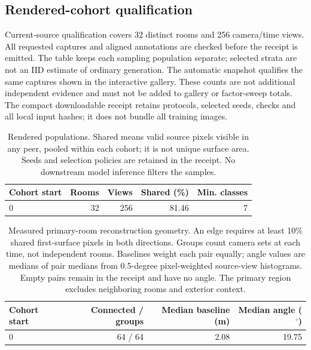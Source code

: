 \subsection{Rendered-cohort qualification}
Current-source qualification covers 32 distinct rooms and 256 camera/time views. All requested captures and aligned annotations are checked before the receipt is emitted. The table keeps each sampling population separate; selected strata are not an IID estimate of ordinary generation. The automatic snapshot qualifies the same captures shown in the interactive gallery. These counts are not additional independent evidence and must not be added to gallery or factor-sweep totals. The compact downloadable receipt retains protocols, selected seeds, checks and all local input hashes; it does not bundle all training images.

\begin{table}[htbp]\centering\small
\begin{tabular}{lrrrr}\toprule
Cohort start & Rooms & Views & Shared (\%) & Min. classes \\
\midrule
0 & 32 & 256 & 81.46 & 7 \\
\bottomrule\end{tabular}
\caption{Rendered populations. Shared means valid source pixels visible in any peer, pooled within each cohort; it is not unique surface area. Seeds and selection policies are retained in the receipt. No downstream model inference filters the samples.}\label{tab:rendered-populations}\end{table}

\begin{table}[htbp]\centering\small
\begin{tabular}{lrrr}\toprule
Cohort start & Connected / groups & Median baseline (m) & Median angle ($^\circ$) \\
\midrule
0 & 64 / 64 & 2.08 & 19.75 \\
\bottomrule\end{tabular}
\caption{Measured primary-room reconstruction geometry. An edge requires at least 10\% shared first-surface pixels in both directions. Groups count camera sets at each time, not independent rooms. Baselines weight each pair equally; angle values are medians of pair medians from 0.5-degree pixel-weighted source-view histograms. Empty pairs remain in the receipt and have no angle. The primary region excludes neighboring rooms and exterior context.}\label{tab:primary-reconstruction}\end{table}

